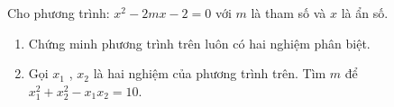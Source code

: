 \begin{ex}
{\begin{enumerate}
\end{enumerate}	
}
	\end{ex}
\begin{ex} %
Cho phương trình: $x^2-2mx-2 = 0$ với $m$ là tham số và $x$ là ẩn số.
	\begin{enumerate}
		\item Chứng minh phương trình trên luôn có hai nghiệm phân biệt.
		\item Gọi $x_1$ , $x_2$ là hai nghiệm của phương trình trên. Tìm $m$ để $x_1^2+x_2^2-x_1x_2=10$.
	\end{enumerate}	
\end{ex}
